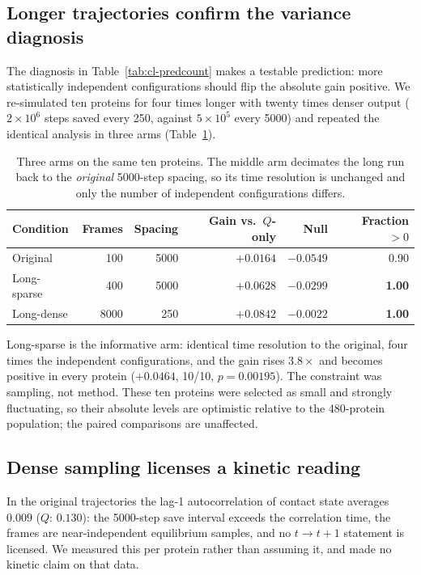 \subsection{Longer trajectories confirm the variance diagnosis}
\label{sec:cl-dense}

The diagnosis in Table~\ref{tab:cl-predcount} makes a testable prediction:
more statistically independent configurations should flip the absolute gain
positive.  We re-simulated ten proteins for four times longer with twenty times
denser output ($2\times10^{6}$ steps saved every 250, against $5\times10^{5}$
every 5000) and repeated the identical analysis in three arms
(Table~\ref{tab:cl-dense}).

\begin{table}[htbp]
\centering
\caption{Three arms on the same ten proteins.  The middle arm decimates the
long run back to the \emph{original} 5000-step spacing, so its time resolution
is unchanged and only the number of independent configurations differs.}
\label{tab:cl-dense}
\begin{tabular}{lrrrrr}
\toprule
Condition & Frames & Spacing & Gain vs.\ $Q$-only & Null & Fraction $>0$ \\
\midrule
Original     & 100   & 5000 & $+0.0164$ & $-0.0549$ & 0.90 \\
Long-sparse  & 400   & 5000 & $\mathbf{+0.0628}$ & $-0.0299$ & \textbf{1.00} \\
Long-dense   & 8000  & 250  & $\mathbf{+0.0842}$ & $-0.0022$ & \textbf{1.00} \\
\bottomrule
\end{tabular}
\end{table}

Long-sparse is the informative arm: identical time resolution to the original,
four times the independent configurations, and the gain rises $3.8\times$ and
becomes positive in every protein ($+0.0464$, 10/10, $p = 0.00195$).  The
constraint was sampling, not method.  These ten proteins were selected as small
and strongly fluctuating, so their absolute levels are optimistic relative to
the 480-protein population; the paired comparisons are unaffected.

\subsection{Dense sampling licenses a kinetic reading}
\label{sec:cl-kinetic}

In the original trajectories the lag-1 autocorrelation of contact state
averages $0.009$ ($Q$: $0.130$): the 5000-step save interval exceeds the
correlation time, the frames are near-independent equilibrium samples, and no
$t \rightarrow t+1$ statement is licensed.  We measured this per protein rather
than assuming it, and made no kinetic claim on that data.

